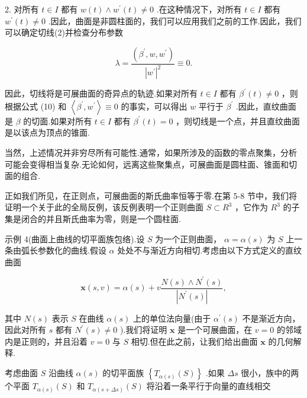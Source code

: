 2. 对所有 \(t \in  I\) 都有 \(w\left( t\right)  \land  {w}^{\prime }\left( t\right)  \neq  0\) .在这种情况下，对所有 \(t \in  I\) 都有 \({w}^{\prime }\left( t\right)  \neq  0\) .因此，曲面是非圆柱面的，我们可以应用我们之前的工作.因此，我们可以确定切线(2)并检查分布参数

\[
\lambda  = \frac{\left( {\beta }^{\prime },w,{w}^{\prime }\right) }{{\left| {w}^{\prime }\right| }^{2}} \equiv  0. \tag{10}
\]

因此，切线将是可展曲面的奇异点的轨迹.如果对所有 \(t \in  I\) 都有 \({\beta }^{\prime }\left( t\right)  \neq  0\) ，则根据公式 (10) 和 \(\left\langle  {{\beta }^{\prime },{w}^{\prime }}\right\rangle   \equiv  0\) 的事实，可以得出 \(w\) 平行于 \({\beta }^{\prime }\) .因此，直纹曲面是 \(\beta\) 的切面.如果对所有 \(t \in  I\) 都有 \({\beta }^{\prime }\left( t\right)  = 0\) ，则切线是一个点，并且直纹曲面是以该点为顶点的锥面.

当然，上述情况并非穷尽所有可能性.通常，如果所涉及的函数的零点聚集，分析可能会变得相当复杂.无论如何，远离这些聚集点，可展曲面是圆柱面、锥面和切面的组合.

正如我们所见，在正则点，可展曲面的斯氏曲率恒等于零.在第 5-8 节中，我们将证明一个关于此的全局反例，该反例表明一个正则曲面 \(S \subset  {R}^{3}\) ，它作为 \({R}^{3}\) 的子集是闭合的并且斯氏曲率为零，则是一个圆柱面.

示例 4(曲面上曲线的切平面族包络).设 \(S\) 为一个正则曲面， \(\alpha  = \alpha \left( s\right)\) 为 \(S\) 上一条由弧长参数化的曲线.假设 \(\alpha\) 处处不与渐近方向相切.考虑由以下方式定义的直纹曲面

\[
\mathbf{x}\left( {s,v}\right)  = \alpha \left( s\right)  + v\frac{N\left( s\right)  \land  {N}^{\prime }\left( s\right) }{\left| {N}^{\prime }\left( s\right) \right| }, \tag{11}
\]

其中 \(N\left( s\right)\) 表示 \(S\) 在曲线 \(\alpha \left( s\right)\) 上的单位法向量(由于 \({\alpha }^{\prime }\left( s\right)\) 不是渐近方向，因此对所有 \(s\) 都有 \({N}^{\prime }\left( s\right)  \neq  0\) ).我们将证明 \(\mathbf{x}\) 是一个可展曲面，在 \(v = 0\) 的邻域内是正则的，并且沿着 \(v = 0\) 与 \(S\) 相切.但在此之前，让我们给出曲面 \(\mathbf{x}\) 的几何解释.

考虑曲面 \(S\) 沿曲线 \(\alpha \left( s\right)\) 的切平面族 \(\left\{  {{T}_{\alpha \left( s\right) }\left( S\right) }\right\}\) .如果 \({\Delta s}\) 很小，族中的两个平面 \({T}_{\alpha \left( s\right) }\left( S\right)\) 和 \({T}_{\alpha \left( {s + {\Delta s}}\right) }\left( S\right)\) 将沿着一条平行于向量的直线相交

